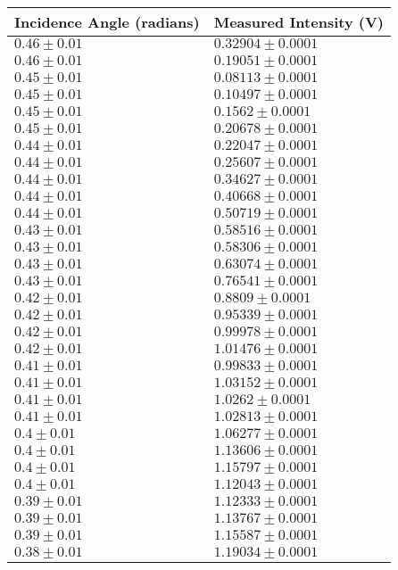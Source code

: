 \begin{tabular}{| p{} | p{} |}
\hline
Incidence Angle (radians) & Measured Intensity (V)\\
\hline
$0.46 \pm 0.01$ & $0.32904 \pm 0.0001$\\
$0.46 \pm 0.01$ & $0.19051 \pm 0.0001$\\
$0.45 \pm 0.01$ & $0.08113 \pm 0.0001$\\
$0.45 \pm 0.01$ & $0.10497 \pm 0.0001$\\
$0.45 \pm 0.01$ & $0.1562 \pm 0.0001$\\
$0.45 \pm 0.01$ & $0.20678 \pm 0.0001$\\
$0.44 \pm 0.01$ & $0.22047 \pm 0.0001$\\
$0.44 \pm 0.01$ & $0.25607 \pm 0.0001$\\
$0.44 \pm 0.01$ & $0.34627 \pm 0.0001$\\
$0.44 \pm 0.01$ & $0.40668 \pm 0.0001$\\
$0.44 \pm 0.01$ & $0.50719 \pm 0.0001$\\
$0.43 \pm 0.01$ & $0.58516 \pm 0.0001$\\
$0.43 \pm 0.01$ & $0.58306 \pm 0.0001$\\
$0.43 \pm 0.01$ & $0.63074 \pm 0.0001$\\
$0.43 \pm 0.01$ & $0.76541 \pm 0.0001$\\
$0.42 \pm 0.01$ & $0.8809 \pm 0.0001$\\
$0.42 \pm 0.01$ & $0.95339 \pm 0.0001$\\
$0.42 \pm 0.01$ & $0.99978 \pm 0.0001$\\
$0.42 \pm 0.01$ & $1.01476 \pm 0.0001$\\
$0.41 \pm 0.01$ & $0.99833 \pm 0.0001$\\
$0.41 \pm 0.01$ & $1.03152 \pm 0.0001$\\
$0.41 \pm 0.01$ & $1.0262 \pm 0.0001$\\
$0.41 \pm 0.01$ & $1.02813 \pm 0.0001$\\
$0.4 \pm 0.01$ & $1.06277 \pm 0.0001$\\
$0.4 \pm 0.01$ & $1.13606 \pm 0.0001$\\
$0.4 \pm 0.01$ & $1.15797 \pm 0.0001$\\
$0.4 \pm 0.01$ & $1.12043 \pm 0.0001$\\
$0.39 \pm 0.01$ & $1.12333 \pm 0.0001$\\
$0.39 \pm 0.01$ & $1.13767 \pm 0.0001$\\
$0.39 \pm 0.01$ & $1.15587 \pm 0.0001$\\
$0.38 \pm 0.01$ & $1.19034 \pm 0.0001$\\
\hline
\end{tabular}\hfill
